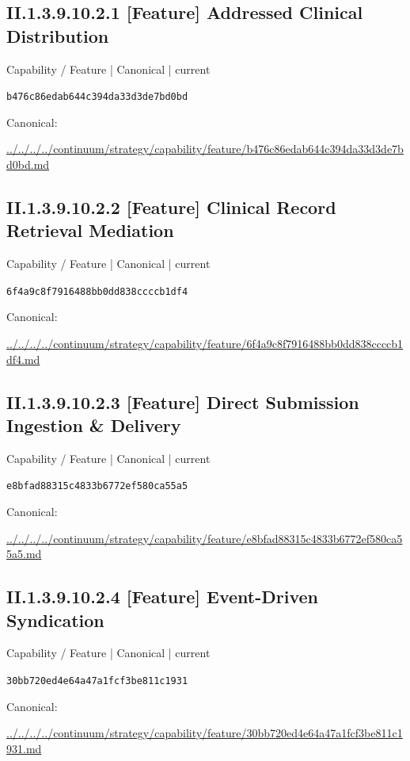 \documentclass[10pt,a4paper]{article}
\begin{document}
\subsection*{II.1.3.9.10.2.1 [Feature] Addressed Clinical Distribution}
\label{element-b476c86edab644c394da33d3de7bd0bd}
{\small Capability / Feature | Canonical | current}\par
\texttt{b476c86edab644c394da33d3de7bd0bd}\par
Canonical: \par
{\footnotesize\url{../../../../continuum/strategy/capability/feature/b476c86edab644c394da33d3de7bd0bd.md}}\par
\subsection*{II.1.3.9.10.2.2 [Feature] Clinical Record Retrieval Mediation}
\label{element-6f4a9c8f7916488bb0dd838ccccb1df4}
{\small Capability / Feature | Canonical | current}\par
\texttt{6f4a9c8f7916488bb0dd838ccccb1df4}\par
Canonical: \par
{\footnotesize\url{../../../../continuum/strategy/capability/feature/6f4a9c8f7916488bb0dd838ccccb1df4.md}}\par
\subsection*{II.1.3.9.10.2.3 [Feature] Direct Submission Ingestion \& Delivery}
\label{element-e8bfad88315c4833b6772ef580ca55a5}
{\small Capability / Feature | Canonical | current}\par
\texttt{e8bfad88315c4833b6772ef580ca55a5}\par
Canonical: \par
{\footnotesize\url{../../../../continuum/strategy/capability/feature/e8bfad88315c4833b6772ef580ca55a5.md}}\par
\subsection*{II.1.3.9.10.2.4 [Feature] Event-Driven Syndication}
\label{element-30bb720ed4e64a47a1fcf3be811c1931}
{\small Capability / Feature | Canonical | current}\par
\texttt{30bb720ed4e64a47a1fcf3be811c1931}\par
Canonical: \par
{\footnotesize\url{../../../../continuum/strategy/capability/feature/30bb720ed4e64a47a1fcf3be811c1931.md}}\par
\end{document}
